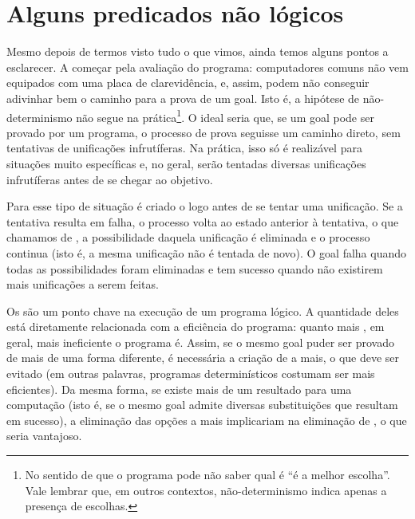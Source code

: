 
%

%
%
%


%

\section{Alguns predicados não lógicos}

Mesmo depois de termos visto tudo o que vimos, ainda temos alguns pontos a esclarecer. A começar pela avaliação do programa: computadores comuns não vem equipados com uma placa de clarevidência, e, assim, podem não conseguir adivinhar bem o caminho para a prova de um goal. Isto é, a hipótese de não-determinismo não segue na prática\footnote{No sentido de que o programa pode não saber qual é ``é a melhor escolha''. Vale lembrar que, em outros contextos, não-determinismo indica apenas a
  presença de escolhas. }. O ideal seria que, se um goal pode ser provado por um programa, o processo de prova seguisse um caminho direto, sem tentativas de unificações infrutíferas. Na prática, isso só é realizável para situações muito específicas e, no geral, serão tentadas
diversas unificações infrutíferas antes de se chegar ao objetivo.

Para esse tipo de situação é criado o  logo antes de se tentar uma unificação. Se a tentativa resulta em falha, o processo volta ao estado anterior à tentativa, o que chamamos de , a possibilidade daquela unificação é eliminada e o processo continua (isto é, a mesma unificação não é tentada de novo). O goal falha quando todas as possibilidades foram eliminadas e tem sucesso quando não existirem mais unificações a serem feitas.

Os  são um ponto chave na execução de um programa lógico. A quantidade deles está diretamente relacionada com a eficiência do programa: quanto mais , em geral, mais ineficiente o programa é. Assim, se o mesmo goal puder ser provado de mais de uma forma diferente, é necessária a criação de  a mais, o que deve ser evitado (em outras palavras, programas determinísticos costumam ser mais eficientes). Da mesma forma, se existe mais
de um resultado para uma computação (isto é, se o mesmo goal admite diversas substituições que resultam em sucesso), a eliminação das opções a mais implicariam na eliminação de , o que seria vantajoso.

